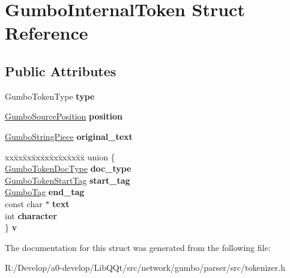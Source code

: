 \hypertarget{struct_gumbo_internal_token}{}\section{Gumbo\+Internal\+Token Struct Reference}
\label{struct_gumbo_internal_token}
\subsection*{Public Attributes}
\begin{DoxyCompactItemize}
\item 
\mbox{\label{struct_gumbo_internal_token_a1dd0333020635db4642142460b33cb10}} 
Gumbo\+Token\+Type {\bfseries type}
\item 
\mbox{\label{struct_gumbo_internal_token_a7c7649d8c5e44db3cf063c7b29f7d71f}} 
\mbox{\hyperlink{struct_gumbo_source_position}{Gumbo\+Source\+Position}} {\bfseries position}
\item 
\mbox{\label{struct_gumbo_internal_token_a55e8c61eaf6dd67ccd9c8602774dd62e}} 
\mbox{\hyperlink{struct_gumbo_string_piece}{Gumbo\+String\+Piece}} {\bfseries original\+\_\+text}
\item 
\mbox{\label{struct_gumbo_internal_token_a7c27c4445f1fff054c806ec9062934cc}} 
\begin{tabbing}
xx\=xx\=xx\=xx\=xx\=xx\=xx\=xx\=xx\=\kill
union \{\\
\>\mbox{\hyperlink{struct_gumbo_internal_token_doc_type}{GumboTokenDocType}} {\bfseries doc\_type}\\
\>\mbox{\hyperlink{struct_gumbo_internal_token_start_tag}{GumboTokenStartTag}} {\bfseries start\_tag}\\
\>\mbox{\hyperlink{gumbo_8h_a5a3aa6f4b039f85875d638088e676a0f}{GumboTag}} {\bfseries end\_tag}\\
\>const char $\ast$ {\bfseries text}\\
\>int {\bfseries character}\\
\} {\bfseries v}\\

\end{tabbing}\end{DoxyCompactItemize}


The documentation for this struct was generated from the following file\+:\begin{DoxyCompactItemize}
\item 
R\+:/\+Develop/a0-\/develop/\+Lib\+Q\+Qt/src/network/gumbo/parser/src/tokenizer.\+h\end{DoxyCompactItemize}

